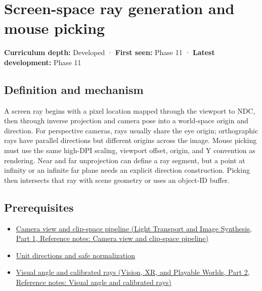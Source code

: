 \hypertarget{appendix-f1a6d43e80d1}{}\label{referencestart:appendix-f1a6d43e80d1}
\section{Screen-space ray generation and mouse picking}\label{appendix-f1a6d43e80d1-screen-space-ray-generation-and-mouse-picking}

\hypertarget{appendix-f1a6d43e80d1-screen-space-ray-generation-and-mouse-picking}{}

\textbf{Curriculum depth:} Developed · \textbf{First seen:} Phase 11 · \textbf{Latest development:} Phase 11

\begin{allmightroledefinition}

\subsection{Definition and mechanism}\label{appendix-f1a6d43e80d1-definition-and-mechanism}

\hypertarget{appendix-f1a6d43e80d1-definition-and-mechanism}{}

A screen ray begins with a pixel location mapped through the viewport to NDC, then through inverse projection and camera pose into a world-space origin and direction. For perspective cameras, rays usually share the eye origin; orthographic rays have parallel directions but different origins across the image. Mouse picking must use the same high-DPI scaling, viewport offset, origin, and Y convention as rendering. Near and far unprojection can define a ray segment, but a point at infinity or an infinite far plane needs an explicit direction construction. Picking then intersects that ray with scene geometry or uses an object-ID buffer.

\end{allmightroledefinition}

\subsection{Prerequisites}\label{appendix-f1a6d43e80d1-prerequisites}

\hypertarget{appendix-f1a6d43e80d1-prerequisites}{}

\begin{itemize}
\tightlist
\item
  \href{../04-Light-Transport-and-Image-Synthesis-P01/main.pdf\#appendix-1c07d64f5e70}{Camera view and clip-space pipeline (Light Transport and Image Synthesis, Part 1, Reference notes: Camera view and clip-space pipeline)}
\item
  \hyperref[appendix-f744e41b95b4]{Unit directions and safe normalization}
\item
  \href{../07-Vision-XR-and-Playable-Worlds-P02/main.pdf\#appendix-7d356c396d1a}{Visual angle and calibrated rays (Vision, XR, and Playable Worlds, Part 2, Reference notes: Visual angle and calibrated rays)}
\end{itemize}

